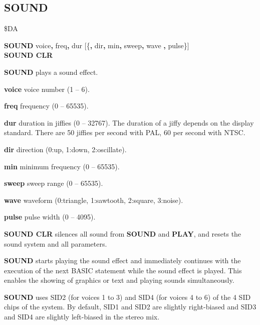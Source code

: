 \subsection{SOUND}
\begin{description}[leftmargin=2cm,style=nextline]
\item [Token:] \$DA
\item [Format:] {\bf SOUND} voice{\bf,} freq{\bf,} dur
                [\{{\bf,} dir{\bf,} min{\bf,} sweep{\bf,} wave
                {\bf,} pulse\}] \\
                {\bf SOUND CLR}

\item [Usage:] {\bf SOUND} plays a sound effect.

               {\bf voice} voice number (1 -- 6).

               {\bf freq} frequency (0 -- 65535).

               {\bf dur} duration in jiffies (0 -- 32767).
                The duration of a jiffy depends on the display standard.
                There are 50 jiffies per second with PAL, 60 per second with NTSC.

               {\bf dir} direction (0:up, 1:down, 2:oscillate).

               {\bf min} minimum frequency (0 -- 65535).

               {\bf sweep} sweep range (0 -- 65535).

               {\bf wave} waveform (0:triangle, 1:sawtooth, 2:square,
               3:noise).

               {\bf pulse} pulse width (0 -- 4095).

               {\bf SOUND CLR} silences all sound from {\bf SOUND} and {\bf PLAY},
               and resets the sound system and all parameters.

\item [Remarks:] {\bf SOUND} starts playing the sound
               effect and immediately continues with the execution
               of the next BASIC statement while the sound effect
               is played. This enables the showing of graphics or text
               and playing sounds simultaneously.

               {\bf SOUND} uses SID2 (for voices 1 to 3) and SID4 (for voices 4 to 6)
               of the 4 SID chips of the system. By default, SID1 and SID2 are slightly
               right-biased and SID3 and SID4 are slightly left-biased in the stereo mix.


\end{description}
